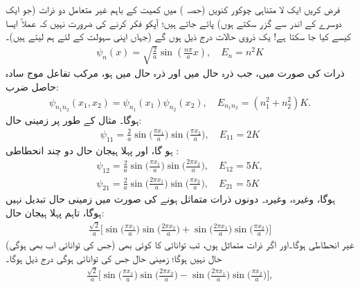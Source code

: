 

فرض کریں ایک لا متناہی چوکور کنویں  (حصہ )  میں کمیت   کے باہم غیر متعامل دو ذرات  (جو ایک دوسرے کے اندر سے گزر سکتے ہوں)  پائے جاتے ہیں؛ آپکو فکر کرنے کی ضرورت نہیں کہ عملاً  ایسا کیسے کیا جا سکتا ہے!  یک ذروی حالات درج ذیل ہوں گے (جہاں اپنی سہولت  کے لئے ہم     لیتے ہیں)۔
\begin{align*}
 \psi_{n} (x)=\sqrt{\frac{2}{a}}\sin(\tfrac{n \pi}{a}x), \quad E_{n}=n^2 K 
\end{align*}
  ذرات کی صورت میں،  جب  ذرہ  حال    میں اور ذرہ  حال   میں ہو،  مرکب تفاعل موج سادہ حاصل ضرب:
\begin{align*}
 \psi_{n_{1} n_{2}} (x_{1},x_{2})=\psi_{n_{1}}(x_{1})\psi_{n_{2}}(x_{2}), \quad E_{n_{1} n_{2}}= (n_{1}^2+n_{2}^2)K. 
\end{align*}
 ہوگا۔ مثال کے طور پر زمینی حال:
\begin{align*}
 \psi_{11}=\frac{2}{a}\sin\big(\frac{\pi x_{1}}{a}\big) \sin\big(\frac{\pi x_{2}}{a}\big), \quad E_{11}=2K
\end{align*}
ہو گا،  اور پہلا ہیجان حال دو چند انحطاطی :
\begin{align*}
 \psi_{12}=\frac{2}{a}\sin\big(\frac{\pi x_{1}}{a}\big) \sin\big(\frac{2\pi x_{2}}{a}\big), \quad E_{12}=5K, \\
\psi_{21}=\frac{2}{a}\sin\big(\frac{2\pi x_{1}}{a}\big) \sin\big(\frac{\pi x_{2}}{a}\big), \quad E_{21}=5K
\end{align*}
ہوگا، وغیرہ،  وغیرہ۔ دونوں ذرات متماثل ہونے کی صورت میں زمینی حال تبدیل نہیں ہوگا،  تاہم پہلا ہیجان حال:
\begin{align*}
\frac{\sqrt{2}}{a}\big[\sin\big(\frac{\pi x_{1}}{a}\big)\sin\big(\frac{2\pi x_{2}}{a}\big)+ \sin\big(\frac{2 \pi x_{1}}{a}\big)\sin\big(\frac{\pi x_{2}}{a}\big)\big]
\end{align*} 
 (جس کی توانائی اب بھی   ہوگی)  غیر انحطاطی ہوگا۔اور اگر ذرات متماثل  ہوں، تب     توانائی کا  کوئی بھی  حال نہیں ہوگا؛   زمینی حال جس کی توانائی   ہوگی  درج ذیل ہوگا۔
\begin{align*}
\frac{\sqrt{2}}{a}\big[\sin\big(\frac{\pi x_{1}}{a}\big) \sin\big(\frac{2 \pi x_{2}}{a}\big)- \sin\big(\frac{2 \pi x_{1}}{a}\big) \sin\big(\frac{\pi x_{2}}{a}\big)\big], 
\end{align*}
